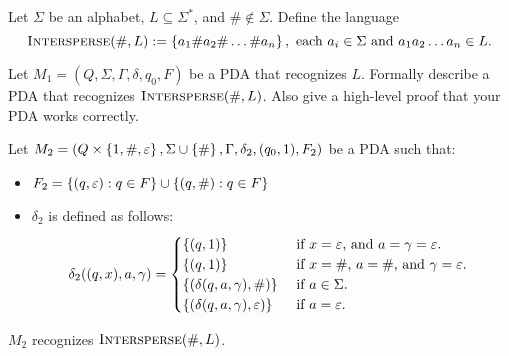 \begin{problem}
  Let $\Sigma$ be an alphabet, $L \subseteq \Sigma^*$,
  and $\# \notin \Sigma$.
  Define the language
  \[ 
    \textsc{Intersperse}(\#, L) := 
    \left\{a_1 \# a_2 \# \ldots \# a_n\right\},
    \text{ each $a_i \in \Sigma$ and $a_1a_2 \ldots a_n \in L$}.
  \]

  \step
  Let $M_1 = (Q, \Sigma, \Gamma, \delta, q_0, F)$ be a PDA
  that recognizes $L$.
  Formally describe a PDA that recognizes $\textsc{Intersperse}(\#, L)$.
  Also give a high-level proof that your PDA works correctly.
\end{problem}
\begin{Answer}
  Let $M_2 = (Q \times \left\{1, \#, \varepsilon\right\}, \Sigma \cup \left\{\#\right\}, \Gamma, \delta_2, (q_0, 1), F_2)$ be a PDA
  such that:
  \begin{itemize}
    \item $F_2 = \left\{(q, \varepsilon): q \in F\right\} \cup \left\{(q, \#): q \in F\right\}$
    \item $\delta_2$ is defined as follows:
    \begin{align*}
      \delta_2((q, x), a, \gamma) = 
      \begin{cases}
        \left\{(q, 1)\right\} & \text{ if $x = \varepsilon$, and $a = \gamma = \varepsilon$. } \\
        \left\{(q, 1)\right\} & \text{ if $x = \#$, $a = \#$, and $\gamma = \varepsilon$. } \\
        \left\{(\delta(q, a, \gamma), \#)\right\} & \text{ if $a \in \Sigma$. } \\
        \left\{(\delta(q, a, \gamma), \varepsilon)\right\} & \text{ if $a = \varepsilon$. } \\
      \end{cases}
    \end{align*}
  \end{itemize}
  \begin{claim}
    $M_2$ recognizes $\textsc{Intersperse}(\#, L)$.


\end{claim}
\end{Answer}
